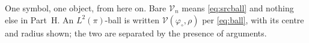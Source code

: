 \begin{definition}
One symbol, one object, from here on. Bare $\mathcal V_n$ means \eqref{eq:srcball} and nothing
else in Part~H. An $L^{2}(\pi)$-ball is written $\mathcal V(\varphi_\circ,\rho)$ per \eqref{eq:ball},
with its centre and radius shown; the two are separated by the presence of arguments.
\end{definition}

